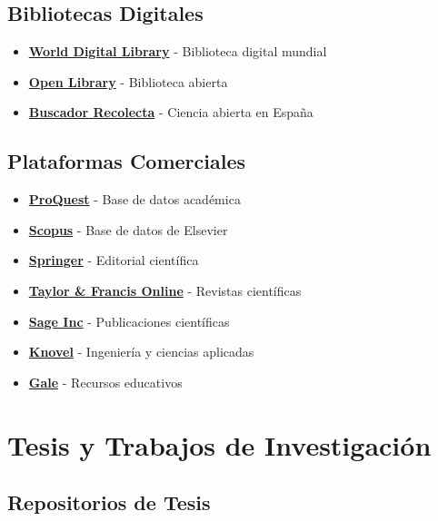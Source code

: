 \documentclass[
  jou,
  floatsintext,
  longtable,
  a4paper,
  nolmodern,
  notxfonts,
  notimes,
  12pt,
  colorlinks=true,linkcolor=blue,citecolor=blue,urlcolor=blue]{apa7}
\providecommand{\tightlist}{%
  \setlength{\itemsep}{0pt}\setlength{\parskip}{0pt}}
\begin{document}
\subsection{Bibliotecas Digitales}\label{bibliotecas-digitales}

\begin{itemize}
\tightlist
\item
  \textbf{\href{https://www.loc.gov/collections/world-digital-library/about-this-collection/}{World
  Digital Library}} - Biblioteca digital mundial
\item
  \textbf{\href{https://openlibrary.org/?lang=es}{Open Library}} -
  Biblioteca abierta
\item
  \textbf{\href{https://buscador.recolecta.fecyt.es/}{Buscador
  Recolecta}} - Ciencia abierta en España
\end{itemize}

\subsection{Plataformas Comerciales}\label{plataformas-comerciales}

\begin{itemize}
\tightlist
\item
  \textbf{\href{https://www.proquest.com/?defaultdiss=true}{ProQuest}} -
  Base de datos académica
\item
  \textbf{\href{https://www.scopus.com/standard/marketing.uri}{Scopus}}
  - Base de datos de Elsevier
\item
  \textbf{\href{https://www.springer.com/la}{Springer}} - Editorial
  científica
\item
  \textbf{\href{https://www.tandfonline.com/}{Taylor \& Francis Online}}
  - Revistas científicas
\item
  \textbf{\href{https://us.sagepub.com/en-us/sam/home}{Sage Inc}} -
  Publicaciones científicas
\item
  \textbf{\href{https://app.knovel.com/kn}{Knovel}} - Ingeniería y
  ciencias aplicadas
\item
  \textbf{\href{https://www.gale.com/}{Gale}} - Recursos educativos
\end{itemize}

\section{Tesis y Trabajos de
Investigación}\label{tesis-y-trabajos-de-investigaciuxf3n}

\subsection{Repositorios de Tesis}\label{repositorios-de-tesis}
\end{document}
